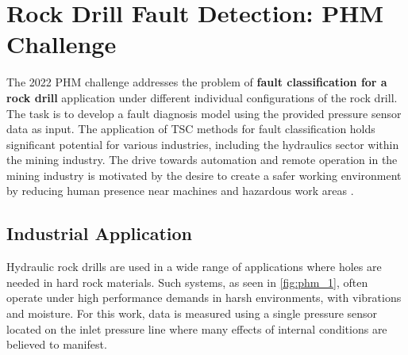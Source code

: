 






\section{Rock Drill Fault Detection: PHM Challenge}\label{sec:phm_challenge}


The 2022 PHM challenge \cite{phm} addresses the problem of \textbf{fault classification for a rock drill} application under different individual configurations of the rock drill. The task is to develop a fault diagnosis model using the provided pressure sensor data as input. 
The application of TSC methods for fault classification holds significant potential for various industries, including the hydraulics sector within the mining industry. The drive towards automation and remote operation in the mining industry is motivated by the desire to create a safer working environment by reducing human presence near machines and hazardous work areas \cite{jakobsson2022time}.

\subsection{Industrial Application}


Hydraulic rock drills are used in a wide range of applications where holes are needed in hard rock materials. Such systems, as seen in \cref{fig:phm_1}, often operate under high performance demands in harsh environments, with vibrations and moisture. 
For this work, data is measured using a single pressure sensor located on the inlet pressure line where many effects of internal conditions are believed to manifest. 


